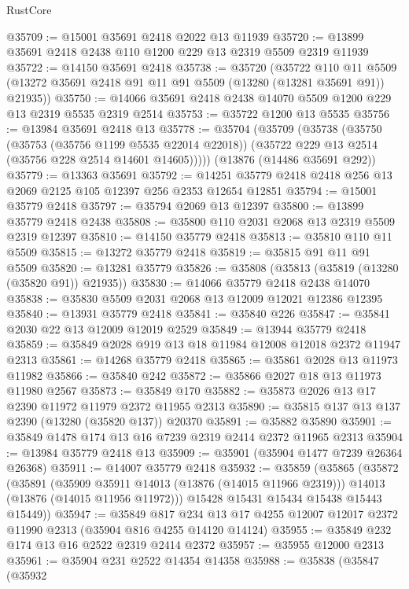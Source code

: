 \begin{lexlean}{RustCore}
\begin{coremodule}
@35709 := @15001 @35691 @2418 @2022 @13 @11939
@35720 := @13899 @35691 @2418 @2438 @110 @1200 @229 @13 @2319 @5509 @2319 @11939
@35722 := @14150 @35691 @2418
@35738 := @35720
    (@35722
      @110
      @11
      @5509
      (@13272 @35691 @2418 @91 @11 @91 @5509 (@13280 (@13281 @35691 @91)) @21935))
@35750 := @14066 @35691 @2418 @2438 @14070 @5509 @1200 @229 @13 @2319 @5535 @2319 @2514
@35753 := @35722 @1200 @13 @5535
@35756 := @13984 @35691 @2418 @13
@35778 := @35704
    (@35709
      (@35738
        (@35750
          (@35753 (@35756 @1199 @5535 @22014 @22018))
          (@35722 @229 @13 @2514 (@35756 @228 @2514 @14601 @14605)))))
    (@13876 (@14486 @35691 @292))
@35779 := @13363 @35691
@35792 := @14251 @35779 @2418 @2418 @256 @13 @2069 @2125 @105 @12397 @256 @2353 @12654 @12851
@35794 := @15001 @35779 @2418
@35797 := @35794 @2069 @13 @12397
@35800 := @13899 @35779 @2418 @2438
@35808 := @35800 @110 @2031 @2068 @13 @2319 @5509 @2319 @12397
@35810 := @14150 @35779 @2418
@35813 := @35810 @110 @11 @5509
@35815 := @13272 @35779 @2418
@35819 := @35815 @91 @11 @91 @5509
@35820 := @13281 @35779
@35826 := @35808 (@35813 (@35819 (@13280 (@35820 @91)) @21935))
@35830 := @14066 @35779 @2418 @2438 @14070
@35838 := @35830 @5509 @2031 @2068 @13 @12009 @12021 @12386 @12395
@35840 := @13931 @35779 @2418
@35841 := @35840 @226
@35847 := @35841 @2030 @22 @13 @12009 @12019 @2529
@35849 := @13944 @35779 @2418
@35859 := @35849 @2028 @919 @13 @18 @11984 @12008 @12018 @2372 @11947 @2313
@35861 := @14268 @35779 @2418
@35865 := @35861 @2028 @13 @11973 @11982
@35866 := @35840 @242
@35872 := @35866 @2027 @18 @13 @11973 @11980 @2567
@35873 := @35849 @170
@35882 := @35873 @2026 @13 @17 @2390 @11972 @11979 @2372 @11955 @2313
@35890 := @35815 @137 @13 @137 @2390 (@13280 (@35820 @137)) @20370
@35891 := @35882 @35890
@35901 := @35849 @1478 @174 @13 @16 @7239 @2319 @2414 @2372 @11965 @2313
@35904 := @13984 @35779 @2418 @13
@35909 := @35901 (@35904 @1477 @7239 @26364 @26368)
@35911 := @14007 @35779 @2418
@35932 := @35859
    (@35865
      (@35872
        (@35891
          (@35909 @35911 @14013 (@13876 (@14015 @11966 @2319)))
          @14013
          (@13876 (@14015 @11956 @11972)))
        @15428
        @15431
        @15434
        @15438
        @15443
        @15449))
@35947 := @35849
    @817
    @234
    @13
    @17
    @4255
    @12007
    @12017
    @2372
    @11990
    @2313
    (@35904 @816 @4255 @14120 @14124)
@35955 := @35849 @232 @174 @13 @16 @2522 @2319 @2414 @2372
@35957 := @35955 @12000 @2313
@35961 := @35904 @231 @2522 @14354 @14358
@35988 := @35838
    (@35847
      (@35932

\end{coremodule}
\end{lexlean}
